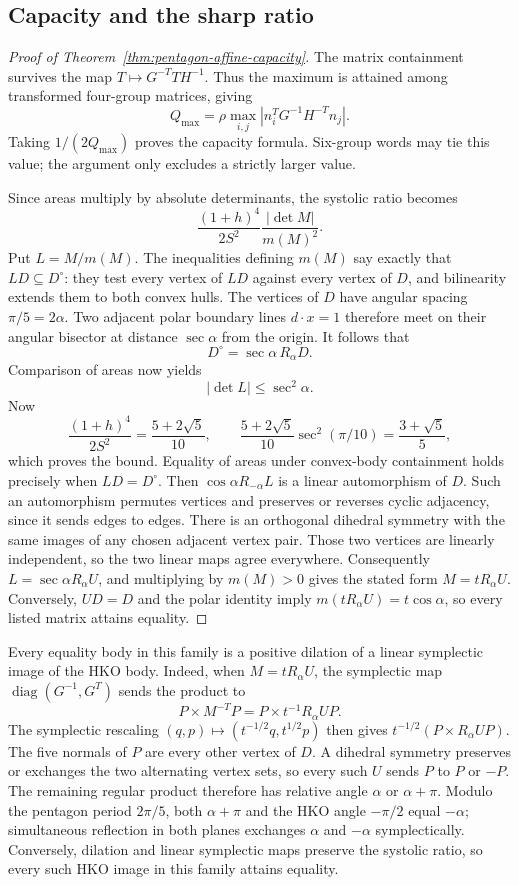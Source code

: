 \subsection{Capacity and the sharp ratio}
\begin{proof}[Proof of Theorem~\ref{thm:pentagon-affine-capacity}]
The matrix containment survives the map $T\mapsto G^{-T}TH^{-1}$.
Thus the maximum is attained among transformed four-group matrices, giving
\[
 Q_{\max}=\rho\max_{i,j}|n_i^TG^{-1}H^{-T}n_j|.
\]
Taking $1/(2Q_{\max})$ proves the capacity formula. Six-group words may tie
this value; the argument only excludes a strictly larger value.

Since areas multiply by absolute determinants, the systolic ratio becomes
\[
 \frac{(1+h)^4}{2S^2}\frac{|\det M|}{m(M)^2}.
\]
Put $L=M/m(M)$. The inequalities defining $m(M)$ say exactly that
$LD\subseteq D^\circ$: they test every vertex of $LD$ against every
vertex of $D$, and bilinearity extends them to both convex hulls.
The vertices of $D$ have angular spacing $\pi/5=2\alpha$.
Two adjacent polar boundary lines $d\cdot x=1$ therefore meet on their
angular bisector at distance $\sec\alpha$ from the origin. It follows that
\[
 D^\circ=\sec\alpha\,R_\alpha D.
\]
Comparison of areas now yields
\[
 |\det L|\le\sec^2\alpha.
\]
Now
\[
 \frac{(1+h)^4}{2S^2}=\frac{5+2\sqrt5}{10},\qquad
 \frac{5+2\sqrt5}{10}\sec^2(\pi/10)=\frac{3+\sqrt5}{5},
\]
which proves the bound. Equality of areas under convex-body containment
holds precisely when $LD=D^\circ$. Then
$\cos\alpha R_{-\alpha}L$ is a linear automorphism of $D$.
Such an automorphism permutes vertices and preserves or reverses cyclic
adjacency, since it sends edges to edges. There is an orthogonal dihedral
symmetry with the same images of any chosen adjacent vertex pair. Those
two vertices are linearly independent, so the two linear maps agree
everywhere. Consequently $L=\sec\alpha R_\alpha U$, and multiplying by
$m(M)>0$ gives the stated form $M=tR_\alpha U$.
Conversely, $UD=D$ and the polar identity imply
$m(tR_\alpha U)=t\cos\alpha$, so every listed matrix attains equality.
\end{proof}

Every equality body in this family is a positive dilation of a linear
symplectic image of the HKO body. Indeed, when $M=tR_\alpha U$, the symplectic
map $\operatorname{diag}(G^{-1},G^T)$ sends the product to
\[
 P\times M^{-T}P=P\times t^{-1}R_\alpha UP.
\]
The symplectic rescaling $(q,p)\mapsto(t^{-1/2}q,t^{1/2}p)$ then gives
$t^{-1/2}(P\times R_\alpha UP)$. The five normals of $P$ are every other
vertex of $D$. A dihedral symmetry preserves or exchanges the two
alternating vertex sets, so every such $U$ sends $P$ to $P$ or $-P$.
The remaining regular product therefore has
relative angle $\alpha$ or $\alpha+\pi$. Modulo the pentagon period
$2\pi/5$, both $\alpha+\pi$ and the HKO angle $-\pi/2$ equal $-\alpha$;
simultaneous reflection in both planes exchanges $\alpha$ and $-\alpha$
symplectically. Conversely, dilation and
linear symplectic maps preserve the systolic ratio, so every such HKO image
in this family attains equality.


